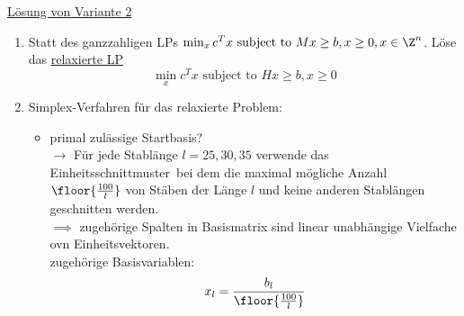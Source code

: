 \begin{beispiel}
\begin{enumerate}
 \end{enumerate}
\underline{Lösung von Variante 2}
\begin{enumerate}
	\item Statt des ganzzahligen LPs $\min_{x} c^{T} x \text{ subject to } Mx \geq b, x \geq 0 , x \in \Z^{n}$. Löse das \underline{relaxierte LP} 
	\begin{equation*}
		\min_{x} c^{T} x \text{ subject to } Hx \geq b, x \geq 0 
	\end{equation*}
	\item Simplex-Verfahren für das relaxierte Problem:
		\begin{itemize}
			\item primal zulässige Startbasis?\\
			$\to$ Für jede Stablänge $l = 25,30,35$ verwende das \glqq Einheitsschnittmuster\grqq\ bei dem die maximal mögliche Anzahl $\floor{\frac{100}{l}}$ von Stäben der Länge $l$ und keine anderen Stablängen geschnitten werden. \\
			$\implies$ zugehörige Spalten in Basismatrix sind linear unabhängige Vielfache ovn Einheitsvektoren.\\
		zugehörige Basisvariablen:
		\begin{equation*}
			x_{l} = \frac{b_{l}}{\floor{\frac{100}{l}}}
		\end{equation*}



\end{itemize}
\end{enumerate}
\end{beispiel}
